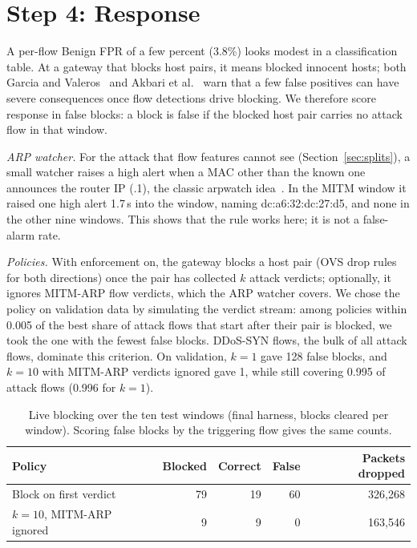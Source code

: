 \section{Step 4: Response}\label{sec:response}

A per-flow Benign FPR of a few percent (3.8\%) looks modest in a classification table. At a gateway that blocks host pairs, it means blocked innocent hosts; both Garcia and Valeros~\cite{garcia2023labeling} and Akbari et al.~\cite{akbari2020atmos} warn that a few false positives can have severe consequences once flow detections drive blocking. We therefore score response in false blocks: a block is false if the blocked host pair carries no attack flow in that window.

\emph{ARP watcher.} For the attack that flow features cannot see (Section~\ref{sec:splits}), a small watcher raises a high alert when a MAC other than the known one announces the router IP (.1), the classic arpwatch idea~\cite{arpwatch}. In the MITM window it raised one high alert 1.7\,s into the window, naming dc:a6:32:dc:27:d5, and none in the other nine windows. This shows that the rule works here; it is not a false-alarm rate.

\emph{Policies.} With enforcement on, the gateway blocks a host pair (OVS drop rules for both directions) once the pair has collected $k$ attack verdicts; optionally, it ignores MITM-ARP flow verdicts, which the ARP watcher covers. We chose the policy on validation data by simulating the verdict stream: among policies within 0.005 of the best share of attack flows that start after their pair is blocked, we took the one with the fewest false blocks. DDoS-SYN flows, the bulk of all attack flows, dominate this criterion. On validation, $k=1$ gave 128 false blocks, and $k=10$ with MITM-ARP verdicts ignored gave 1, while still covering 0.995 of attack flows (0.996 for $k=1$).

\begin{table}[t]
\centering
\caption{Live blocking over the ten test windows (final harness, blocks cleared per window). Scoring false blocks by the triggering flow gives the same counts.}
\label{tab:blocking}
\footnotesize
\setlength{\tabcolsep}{3pt}
\begin{tabular}{lrrrr}
\hline
Policy & Blocked & Correct & False & Packets dropped \\
\hline
Block on first verdict & 79 & 19 & 60 & 326,268 \\
$k=10$, MITM-ARP ignored & 9 & 9 & 0 & 163,546 \\
\hline
\end{tabular}
\end{table}

